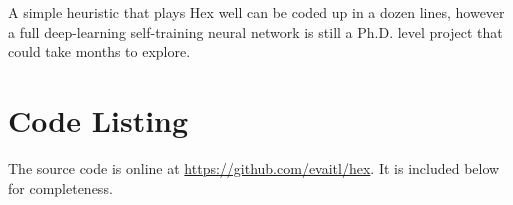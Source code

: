 \documentclass[12pt,titlepage]{amsart}
\begin{document}
A simple heuristic that plays Hex well can be coded up in a dozen
lines, however a full deep-learning self-training neural network is
still a Ph.D. level project that could take months to explore. 



\appendix
\section{Code Listing}

The source code is online at \url{https://github.com/evaitl/hex}. It is included
below for completeness.

\singlespacing

\end{document}

